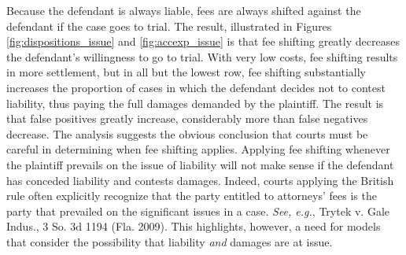 \documentclass{article}
\begin{document}
Because the defendant is always liable, fees are always shifted against the defendant if the case goes to trial. The result, illustrated in Figures \ref{fig:dispositions_issue} and \ref{fig:accexp_issue} is that fee shifting greatly decreases the defendant's willingness to go to trial. With very low costs, fee shifting results in more settlement, but in all but the lowest row, fee shifting substantially increases the proportion of cases in which the defendant decides not to contest liability, thus paying the full damages demanded by the plaintiff. The result is that false positives greatly increase, considerably more than false negatives decrease. The analysis suggests the obvious conclusion that courts must be careful in determining when fee shifting applies. Applying fee shifting whenever the plaintiff prevails on the issue of liability will not make sense if the defendant has conceded liability and contests damages. Indeed, courts applying the British rule often explicitly recognize that the party entitled to attorneys' fees is the party that prevailed on the significant issues in a case. \textit{See, e.g.}, Trytek v. Gale Indus., 3 So. 3d 1194 (Fla. 2009). This highlights, however, a need for models that consider the possibility that liability \textit{and} damages are at issue. 
\end{document}
